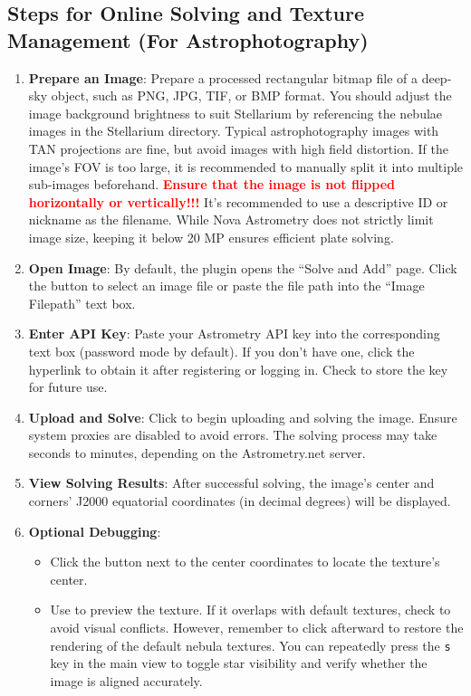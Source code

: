 \subsection{Steps for Online Solving and Texture Management (For Astrophotography)}
\begin{enumerate}
    \item \textbf{Prepare an Image}: Prepare a processed rectangular bitmap file of a deep-sky object, such as 
    PNG, JPG, TIF, or BMP format. You should adjust the image background brightness to suit Stellarium 
    by referencing the nebulae images in the Stellarium  directory. Typical 
    astrophotography images with TAN projections are fine, but avoid images with high field distortion. 
	If the image's FOV is too large, it is recommended to manually split it into multiple sub-images beforehand. 
	\textbf{\textcolor{red}{Ensure that the image is not flipped horizontally or vertically!!!}} 
    It’s recommended to use a descriptive ID or nickname as the filename. 
	While Nova Astrometry does not strictly limit image size, keeping it below 20 MP 
    ensures efficient plate solving.

    \item \textbf{Open Image}: By default, the plugin opens the “Solve and Add” page. Click the  
    button to select an image file or paste the file path into the “Image Filepath” text box.

    \item \textbf{Enter API Key}: Paste your Astrometry API key into the corresponding text box (password 
    mode by default). If you don’t have one, click the  hyperlink to obtain it 
    after registering or logging in. Check  to store the key for future use.

    \item \textbf{Upload and Solve}: Click  to begin uploading and solving the image. Ensure system 
    proxies are disabled to avoid errors. The solving process may take seconds to minutes, 
	depending on the Astrometry.net server.

    \item \textbf{View Solving Results}: After successful solving, the image's center and corners' J2000 
	equatorial coordinates (in decimal degrees) will be displayed.

    \item \textbf{Optional Debugging}:
    \begin{itemize}
        \item Click the  button next to the center coordinates to locate the texture's center.
        \item Use  to preview the texture. If it overlaps with default 
		textures, check  to avoid visual conflicts. However, remember 
		to click  afterward to restore the rendering of the default nebula textures.
		You can repeatedly press the \texttt{s} key in the main view to toggle star visibility and verify whether the image is aligned accurately.
    \end{itemize}


\end{enumerate}
